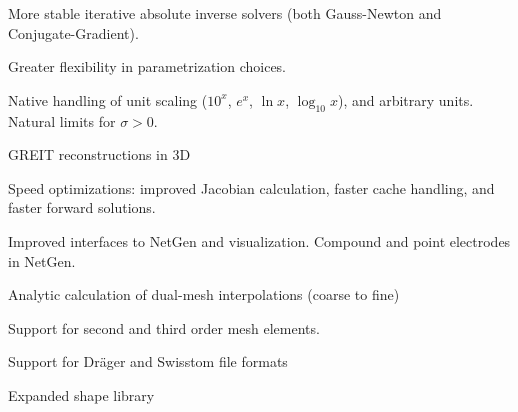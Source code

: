 \documentclass[portrait,final,a0paper,fontscale=0.277]{baposter}
\begin{document}
\begin{poster}
{%
\colouredcircle
   More stable
  iterative absolute inverse solvers (both Gauss-Newton and
  Conjugate-Gradient).

\colouredcircle
   Greater flexibility in parametrization choices.

\colouredcircle
   Native handling of unit scaling ($10^x$, $e^x$, $\ln x$, $\log_{10} x$),
 and arbitrary units.
  Natural limits for $\sigma > 0$. %

\colouredcircle
   GREIT reconstructions in 3D

\colouredcircle
   Speed optimizations: improved Jacobian calculation, faster cache handling, and 
  faster forward solutions.


\colouredcircle
   Improved interfaces to NetGen and visualization.
      Compound and point electrodes in NetGen.

\colouredcircle
   Analytic calculation of dual-mesh interpolations (coarse to fine)

\colouredcircle
   Support for second and third order mesh elements.

\colouredcircle
   Support for Dr\"ager and Swisstom file formats

\colouredcircle
   Expanded shape library
   \vspace{0.6em}
   \vfil
  }


\end{poster}
\end{document}
